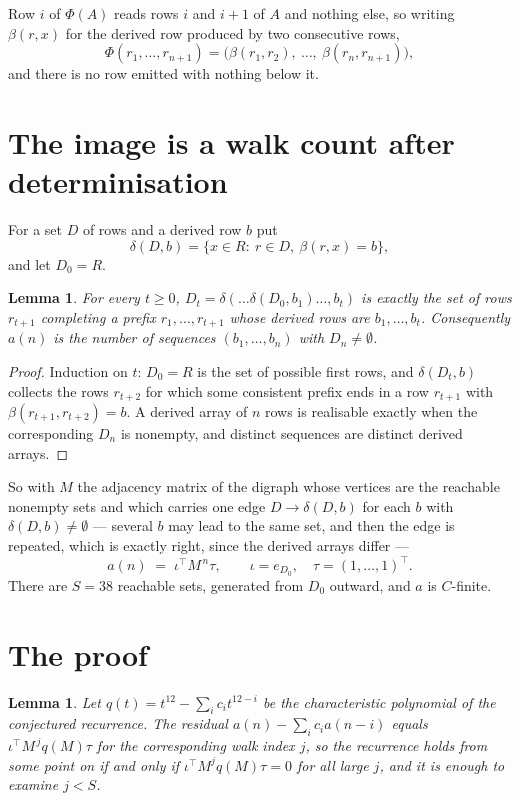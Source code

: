 \documentclass[11pt,a4paper]{article}
\theoremstyle{plain}
\newtheorem{lemma}[theorem]{Lemma}
\theoremstyle{definition}
\begin{document}
Row $i$ of $\Phi(A)$ reads rows $i$ and $i+1$ of $A$ and nothing else, so
writing $\beta(r,x)$ for the derived row produced by two consecutive rows,
\[
\Phi(r_1,\dots,r_{n+1})=\bigl(\beta(r_1,r_2),\ \dots,\ \beta(r_n,r_{n+1})\bigr),
\]
and there is no row emitted with nothing below it.

\section{The image is a walk count after determinisation}

For a set $D$ of rows and a derived row $b$ put
\[
\delta(D,b)=\{x\in R:\ r\in D,\ \beta(r,x)=b\},
\]
and let $D_0=R$.

\begin{lemma}\label{lem:det}
For every $t\ge0$, $D_t=\delta(\dots\delta(D_0,b_1)\dots,b_t)$ is exactly the set of rows
$r_{t+1}$ completing a prefix $r_1,\dots,r_{t+1}$ whose derived rows are $b_1,\dots,b_t$.
Consequently $a(n)$ is the number of sequences $(b_1,\dots,b_n)$ with $D_n\neq\emptyset$.
\end{lemma}

\begin{proof}
Induction on $t$: $D_0=R$ is the set of possible first rows, and $\delta(D_t,b)$ collects the
rows $r_{t+2}$ for which some consistent prefix ends in a row $r_{t+1}$ with
$\beta(r_{t+1},r_{t+2})=b$. A derived array of $n$ rows is realisable exactly when the
corresponding $D_n$ is nonempty, and distinct sequences are distinct derived arrays.
\end{proof}

So with $M$ the adjacency matrix of the digraph whose vertices are the reachable nonempty sets
and which carries one edge $D\to\delta(D,b)$ for each $b$ with $\delta(D,b)\neq\emptyset$ ---
several $b$ may lead to the same set, and then the edge is repeated, which is exactly right,
since the derived arrays differ ---
\[
a(n)\;=\;\iota^{\!\top}M^{\,n}\tau,\qquad \iota=e_{D_0},\quad \tau=(1,\dots,1)^{\!\top} .
\]
There are $S=38$ reachable sets, generated from $D_0$ outward, and $a$ is $C$-finite.


\section{The proof}

\begin{lemma}\label{lem:crit}
Let $q(t)=t^{12}-\sum_i c_it^{12-i}$ be the characteristic polynomial of the
conjectured recurrence. The residual $a(n)-\sum_ic_ia(n-i)$ equals
$\iota^{\!\top}M^{\,j}q(M)\tau$ for the corresponding walk index $j$, so the recurrence
holds from some point on if and only if $\iota^{\!\top}M^{j}q(M)\tau=0$ for all large $j$,
and it is enough to examine $j<S$.
\end{lemma}
\end{document}
